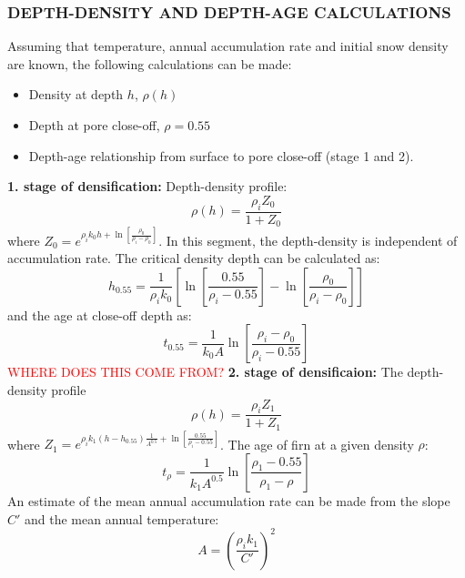\documentclass[11pt]{article}
\begin{document}
\subsubsection{DEPTH-DENSITY AND DEPTH-AGE CALCULATIONS}
Assuming that temperature, annual accumulation rate and initial snow density are known, the following calculations can be made:
\begin{itemize}
	\item Density at depth $h$, $\rho(h)$
	\item Depth at pore close-off, $\rho=0.55$
	\item Depth-age relationship from surface to pore close-off (stage 1 and 2).
\end{itemize}
\textbf{1. stage of densification:}
Depth-density profile:
\begin{equation}
	\rho(h) = \frac{\rho_i Z_0}{1 + Z_0}
\end{equation}
where $Z_0 = e^{\rho_i k_0 h + \ln\left[\frac{\rho_0}{\rho_i - \rho_0}\right]}$. In this segment, the depth-density is independent of accumulation rate. The critical density depth can be calculated as:
\begin{equation}
	h_{0.55} = \frac{1}{\rho_i k_0}\left[\ln\left[\frac{0.55}{\rho_i - 0.55}\right] - \ln\left[\frac{\rho_0}{\rho_i - \rho_0}\right]\right]
\end{equation}
and the age at close-off depth as:
\begin{equation}
	t_{0.55} = \frac{1}{k_0 A}\ln\left[\frac{\rho_i - \rho_0}{\rho_i - 0.55}\right]
\end{equation}
\textcolor{red}{WHERE DOES THIS COME FROM?}
\textbf{2. stage of densificaion:} The depth-density profile
\begin{equation}
	\rho(h) = \frac{\rho_i Z_1}{1 + Z_1}
\end{equation}
where $Z_1 = e^{\rho_i k_1 (h - h_{0.55})\frac{1}{A^{0.5}} + \ln\left[\frac{0.55}{\rho_i - 0.55}\right]}$. The age of firn at a given density $\rho$:
\begin{equation}
t_{\rho} = \frac{1}{k_1 A^{0.5}}\ln\left[\frac{\rho_1 - 0.55}{\rho_1 - \rho}\right]
\end{equation}
An estimate of the mean annual accumulation rate can be made from the slope $C'$ and the mean annual temperature:
\begin{equation}
	A = \left(\frac{\rho_i k_1}{C'}\right)^2
\end{equation}


\begin{appendices}
\end{appendices}
	
\end{document}
